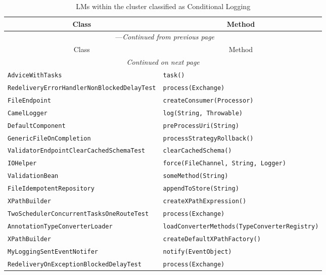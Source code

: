 \begin{center}
\begin{longtable}{ll}
\caption{LMs within the cluster classified as Conditional Logging}\\
\toprule\multicolumn{1}{c}{Class}&\multicolumn{1}{c}{Method}\\\midrule
\endfirsthead

\multicolumn{2}{c}{\tablename\ \thetable{}---\textit{Continued from previous page}} \\\midrule
\multicolumn{1}{c}{Class}&\multicolumn{1}{c}{Method}\\\midrule
\endhead
\multicolumn{2}{c}{\textit{Continued on next page}}\\\midrule
\endfoot
\bottomrule
\endlastfoot

\lstinline/AdviceWithTasks/&{\lstinline/task()/}\\
\lstinline/RedeliveryErrorHandlerNonBlockedDelayTest/&{\lstinline/process(Exchange)/}\\
\lstinline/FileEndpoint/&{\lstinline/createConsumer(Processor)/}\\
\lstinline/CamelLogger/&{\lstinline/log(String, Throwable)/}\\
\lstinline/DefaultComponent/&{\lstinline/preProcessUri(String)/}\\
\lstinline/GenericFileOnCompletion/&{\lstinline/processStrategyRollback()/}\\
\lstinline/ValidatorEndpointClearCachedSchemaTest/&{\lstinline/clearCachedSchema()/}\\
\lstinline/IOHelper/&{\lstinline/force(FileChannel, String, Logger)/}\\
\lstinline/ValidationBean/&{\lstinline/someMethod(String)/}\\
\lstinline/FileIdempotentRepository/&{\lstinline/appendToStore(String)/}\\
\lstinline/XPathBuilder/&{\lstinline/createXPathExpression()/}\\
\lstinline/TwoSchedulerConcurrentTasksOneRouteTest/&{\lstinline/process(Exchange)/}\\
\lstinline/AnnotationTypeConverterLoader/&{\lstinline/loadConverterMethods(TypeConverterRegistry)/}\\
\lstinline/XPathBuilder/&{\lstinline/createDefaultXPathFactory()/}\\
\lstinline/MyLoggingSentEventNotifer/&{\lstinline/notify(EventObject)/}\\
\lstinline/RedeliveryOnExceptionBlockedDelayTest/&{\lstinline/process(Exchange)/}\\

\end{longtable}
\end{center}
